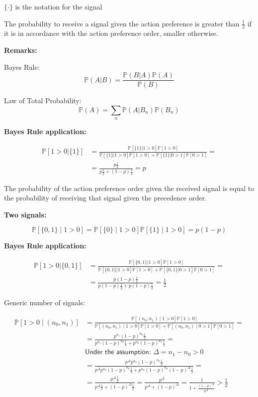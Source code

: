 \documentclass[10pt,a4paper]{article}
\begin{document}
$\{\cdot\}$ is the notation for the signal

The probability to receive a signal given the action preference is greater than $\frac{1}{2}$ if it is in accordance with the action preference order, smaller otherwise.

\textbf{Remarks:}

Bayes Rule:
$$\mathbb{P}(A|B) = \frac{\mathbb{P}(B|A)\mathbb{P}(A)}{\mathbb{P}(B)}$$

Law of Total Probability:
$$\mathbb{P}(A) = \sum_{n}{\mathbb{P}(A|B_{n})\mathbb{P}(B_{n})}$$

\textbf{Bayes Rule application:}

$$\begin{aligned}
\mathbb{P}[1>0 |\{1\}] &=\frac{\mathbb{P}[\{1\} | 1>0] \mathbb{P}[1>0]}{\mathbb{P}[\{1\} | 1>0] \mathbb{P}[1>0]+\mathbb{P}[\{1\} | 0>1] \mathbb{P}[0>1]}= \\
&=\frac{p \frac{1}{2}}{p \frac{1}{2} + (1-p) \frac{1}{2}}=p
\end{aligned}$$

The probability of the action preference order given the received signal is equal to the probability of receiving that signal given the precedence order.
\newline

\textbf{Two signals:}

$$\mathbb{P}[\{0,1\} \mid 1>0]=\mathbb{P}[\{0\} \mid 1>0] \mathbb{P}[\{1\} \mid 1>0]=p(1-p)$$
\newline

\textbf{Bayes Rule application:}

$$\begin{aligned}
\mathbb{P}[1>0 |\{0,1\}]&=\frac{\mathbb{P}[\{0,1\} | 1>0] \mathbb{P}[1>0]}{\mathbb{P}[\{0,1\} | 1>0] \mathbb{P}[1>0]+\mathbb{P}[\{0,1\}| 0>1] \mathbb{P}[0>1]}= \\
&=\frac{p(1-p) \frac{1}{2}}{p(1-p) \frac{1}{2}+p(1-p) \frac{1}{2}}=\frac{1}{2}
\end{aligned}$$

Generic number of signals:

$$\begin{aligned}
\mathbb{P}\left[1>0 \mid\left(n_{0}, n_{1}\right)\right] &=\frac{\mathbb{P}\left[\left(n_{0}, n_{1}\right) \mid 1>0\right] \mathbb{P}[1>0]}{\mathbb{P}\left[\left(n_{0}, n_{1}\right) \mid 1>0\right] \mathbb{P}[1>0]+\mathbb{P}\left[\left(n_{0}, n_{1}\right) \mid 0>1\right] \mathbb{P}[0>1]}= \\
&=\frac{p^{n_{1}}(1-p)^{n_{0}} \frac{1}{2}}{p^{n_{1}}(1-p)^{n_{0}} \frac{1}{2}+p^{n_{0}}(1-p)^{n_{1}} \frac{1}{2}}= \\
&\textsf{Under the assumption: } \Delta=n_{1}-n_{0}>0 \\ &=\frac{p^{\Delta}p^{n_{0}}(1-p)^{n_{0}} \frac{1}{2}}{p^{\Delta}p^{n_{0}}(1-p)^{n_{0}} \frac{1}{2}+p^{n_{0}}(1-p)^{n_{0}}(1-p)^{\Delta} \frac{1}{2}}= \\
&=\frac{p^{\Delta} \frac{1}{2}}{p^{\Delta} \frac{1}{2}+(1-p)^{\Delta} \frac{1}{2}}=\frac{p^{\Delta}}{p^{\Delta}+(1-p)^{\Delta}}=\frac{1}{1+\frac{(1-p)^{\Delta}}{p^{\Delta}}}>\frac{1}{2}
\end{aligned}$$
\end{document}
